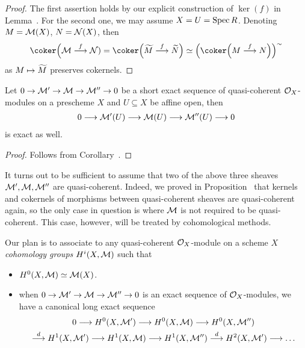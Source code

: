 \documentclass[a4paper,parskip=half,numbers=enddot, DIV=12]{scrreprt}
\begin{document}
\begin{proof}
	The first assertion holds by our explicit construction of $\ker(f)$ in Lemma~. For the second one, we may assume $X=U=\operatorname{Spec} R$. Denoting $M=\mathcal{M}(X)$, $N=\mathcal{N}(X)$, then
	\begin{align*}
		\coker\Big(\Mm\morphism[f]\Nn)=\coker\Big(\snake{M}\morphism[f]\snake{N}\Big)\simeq\Big(\coker\Big(M\morphism[f]N\Big)\Big)^\sim
	\end{align*}
	as $M\mapsto\snake{M}$ preserves cokernels.
\end{proof}
\begin{cor}
	Let $0\morphism\Mm'\morphism\Mm\morphism\Mm''\morphism0$ be a short exact sequence of quasi-coherent $\mathcal{O}_X$-modules on a prescheme $X$ and $U\subseteq X$ be affine open, then 
	\begin{align*}
		0\morphism\Mm'(U)\morphism\Mm(U)\morphism\Mm''(U)\morphism 0
	\end{align*}
	is exact as well.
\end{cor}
\begin{proof}
	Follows from Corollary~.
\end{proof}
\begin{rem*}
	It turns out to be sufficient to assume that two of the above three sheaves $\mathcal{M}',\mathcal{M},\mathcal{M}''$ are quasi-coherent. Indeed, we proved in Proposition~ that kernels and cokernels of morphisms between quasi-coherent sheaves are quasi-coherent again, so the only case in question is where $\mathcal{M}$ is not required to be quasi-coherent. This case, however, will be treated by cohomological methods.
\end{rem*}
Our plan is to associate to any quasi-coherent $\mathcal{O}_X$-module on a scheme $X$ \emph{cohomology groups} $H^i(X,\mathcal{M})$ such that
\begin{itemize}
	\item $H^0(X,\mathcal{M})\simeq\mathcal{M}(X)$.
	\item when $0\morphism\Mm'\morphism\Mm\morphism\Mm''\morphism0$ is an exact sequence of $\mathcal{O}_X$-modules, we have a canonical long exact sequence
	\begin{multline*}
		0\morphism H^0(X,\Mm')\morphism H^0(X,\Mm)\morphism H^0(X,\Mm'')\\
		\morphism[d] H^1(X,\Mm')\morphism H^1(X,\Mm)\morphism H^1(X,\Mm'')\morphism[d]H^2(X,\Mm')\morphism\ldots
	\end{multline*}
\end{itemize}
\end{document}
